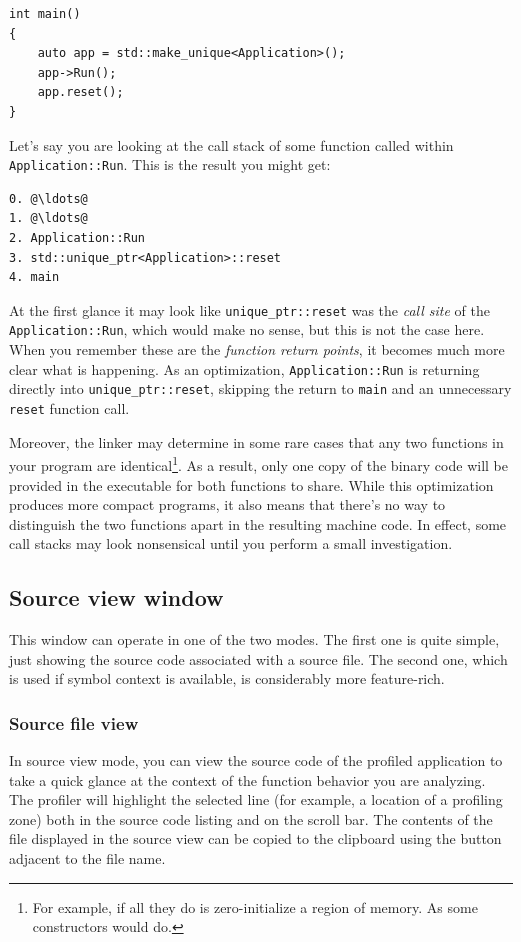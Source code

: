\documentclass[hidelinks,titlepage,a4paper,twoside]{article}
\begin{document}
\begin{lstlisting}
int main()
{
    auto app = std::make_unique<Application>();
    app->Run();
    app.reset();
}
\end{lstlisting}

Let's say you are looking at the call stack of some function called within \texttt{Application::Run}. This is the result you might get:

\begin{lstlisting}
0. @\ldots@
1. @\ldots@
2. Application::Run
3. std::unique_ptr<Application>::reset
4. main
\end{lstlisting}

At the first glance it may look like \texttt{unique\_ptr::reset} was the \emph{call site} of the \texttt{Application::Run}, which would make no sense, but this is not the case here. When you remember these are the \emph{function return points}, it becomes much more clear what is happening. As an optimization, \texttt{Application::Run} is returning directly into \texttt{unique\_ptr::reset}, skipping the return to \texttt{main} and an unnecessary \texttt{reset} function call.

Moreover, the linker may determine in some rare cases that any two functions in your program are identical\footnote{For example, if all they do is zero-initialize a region of memory. As some constructors would do.}. As a result, only one copy of the binary code will be provided in the executable for both functions to share. While this optimization produces more compact programs, it also means that there's no way to distinguish the two functions apart in the resulting machine code. In effect, some call stacks may look nonsensical until you perform a small investigation.

\subsection{Source view window}
\label{sourceview}

This window can operate in one of the two modes. The first one is quite simple, just showing the source code associated with a source file. The second one, which is used if symbol context is available, is considerably more feature-rich.

\subsubsection{Source file view}

In source view mode, you can view the source code of the profiled application to take a quick glance at the context of the function behavior you are analyzing. The profiler will highlight the selected line (for example, a location of a profiling zone) both in the source code listing and on the scroll bar. The contents of the file displayed in the source view can be copied to the clipboard using the button adjacent to the file name.
\end{document}
